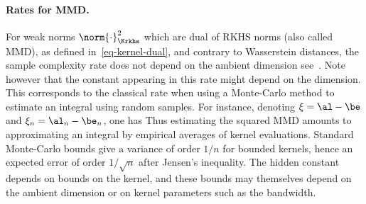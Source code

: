 \paragraph{Rates for MMD.}

For weak norms $\norm{\cdot}^2_{\Krkhs}$ which are dual of RKHS norms (also called MMD), as defined in~\eqref{eq-kernel-dual}, and contrary to Wasserstein distances, the sample complexity rate does not depend on the ambient dimension
see~\cite{sriperumbudur2012empirical}. Note however that the constant appearing in this rate might depend on the dimension.
%
This corresponds to the classical rate when using a Monte-Carlo method to estimate an integral using random samples.
%
For instance, denoting $\xi=\al-\be$ and $\xi_n=\al_n-\be_n$, one has
Thus estimating the squared MMD amounts to approximating an integral by empirical averages of kernel evaluations. Standard Monte-Carlo bounds give a variance of order $1/n$ for bounded kernels, hence an expected error of order $1/\sqrt n$ after Jensen's inequality. The hidden constant depends on bounds on the kernel, and these bounds may themselves depend on the ambient dimension or on kernel parameters such as the bandwidth.

%
%



